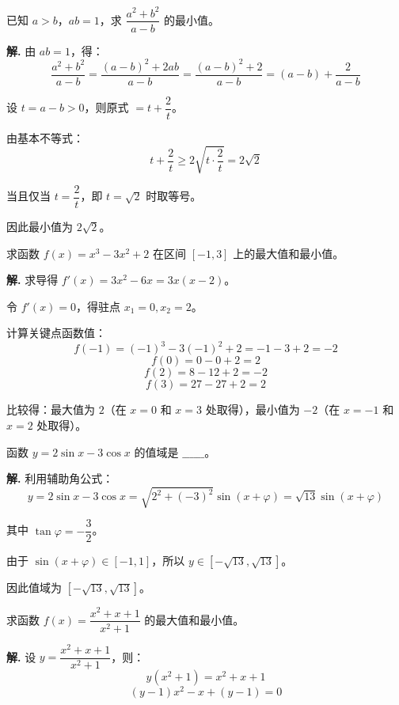 \documentclass[11pt]{ctexrep}
\begin{document}
\begin{realexam}[2025 上海高三二模]
    已知 $a > b$，$ab = 1$，求 $\dfrac{a^2 + b^2}{a-b}$ 的最小值。
\end{realexam}

\textbf{解.} 由 $ab = 1$，得：
\[
    \frac{a^2 + b^2}{a-b} = \frac{(a-b)^2 + 2ab}{a-b} = \frac{(a-b)^2 + 2}{a-b} = (a-b) + \frac{2}{a-b}
\]

设 $t = a - b > 0$，则原式 $= t + \dfrac{2}{t}$。

由基本不等式：
\[
    t + \frac{2}{t} \geq 2\sqrt{t \cdot \frac{2}{t}} = 2\sqrt{2}
\]

当且仅当 $t = \dfrac{2}{t}$，即 $t = \sqrt{2}$ 时取等号。

因此最小值为 $2\sqrt{2}$。

\begin{example}[利用导数求最值]
    求函数 $f(x) = x^3 - 3x^2 + 2$ 在区间 $[-1, 3]$ 上的最大值和最小值。
\end{example}

\textbf{解.} 求导得 $f'(x) = 3x^2 - 6x = 3x(x-2)$。

令 $f'(x) = 0$，得驻点 $x_1 = 0, x_2 = 2$。

计算关键点函数值：
\[
    f(-1) = (-1)^3 - 3(-1)^2 + 2 = -1 - 3 + 2 = -2
\]
\[
    f(0) = 0 - 0 + 2 = 2
\]
\[
    f(2) = 8 - 12 + 2 = -2
\]
\[
    f(3) = 27 - 27 + 2 = 2
\]

比较得：最大值为 $2$（在 $x = 0$ 和 $x = 3$ 处取得），最小值为 $-2$（在 $x = -1$ 和 $x = 2$ 处取得）。

\begin{realexam}[2025 上海高三二模]
    函数 $y = 2\sin x - 3\cos x$ 的值域是 $\_\_\_\_\_\_$。
\end{realexam}

\textbf{解.} 利用辅助角公式：
\[
    y = 2\sin x - 3\cos x = \sqrt{2^2 + (-3)^2} \sin(x + \varphi) = \sqrt{13} \sin(x + \varphi)
\]

其中 $\tan\varphi = -\dfrac{3}{2}$。

由于 $\sin(x+\varphi) \in [-1, 1]$，所以 $y \in [-\sqrt{13}, \sqrt{13}]$。

因此值域为 $[-\sqrt{13}, \sqrt{13}]$。

\begin{example}[分式函数的最值]
    求函数 $f(x) = \dfrac{x^2 + x + 1}{x^2 + 1}$ 的最大值和最小值。
\end{example}

\textbf{解.} 设 $y = \dfrac{x^2 + x + 1}{x^2 + 1}$，则：
\[
    y(x^2 + 1) = x^2 + x + 1
\]
\[
    (y-1)x^2 - x + (y-1) = 0
\]
\end{document}
